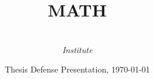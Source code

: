 \documentclass[10pt]{beamer}
\title[MATH]{MATH}%
\author{%
    \sc{Ph.D. candidate: }\\
    \textit{Institute}
}
\institute{%
    \sc{Advisor: }\\
    \textit{Institute}
}
\date[\today]{Thesis Defense Presentation, \today}
\begin{document}
    \begin{frame}[plain]
        \titlepage
    \end{frame}
\end{document}
